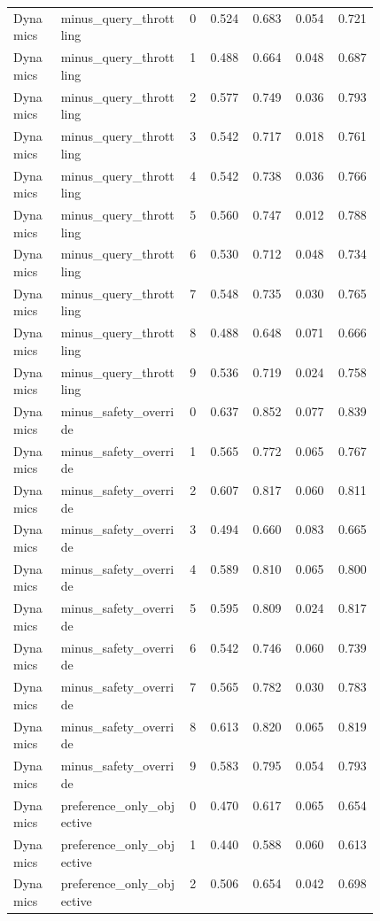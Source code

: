 \documentclass{article}
\begin{document}
\begin{center}
\begin{longtable}{p{0.13\linewidth}p{0.35\linewidth}rrrrr}
Dynamics & minus\_query\_throttling & 0 & 0.524 & 0.683 & 0.054 & 0.721\\
Dynamics & minus\_query\_throttling & 1 & 0.488 & 0.664 & 0.048 & 0.687\\
Dynamics & minus\_query\_throttling & 2 & 0.577 & 0.749 & 0.036 & 0.793\\
Dynamics & minus\_query\_throttling & 3 & 0.542 & 0.717 & 0.018 & 0.761\\
Dynamics & minus\_query\_throttling & 4 & 0.542 & 0.738 & 0.036 & 0.766\\
Dynamics & minus\_query\_throttling & 5 & 0.560 & 0.747 & 0.012 & 0.788\\
Dynamics & minus\_query\_throttling & 6 & 0.530 & 0.712 & 0.048 & 0.734\\
Dynamics & minus\_query\_throttling & 7 & 0.548 & 0.735 & 0.030 & 0.765\\
Dynamics & minus\_query\_throttling & 8 & 0.488 & 0.648 & 0.071 & 0.666\\
Dynamics & minus\_query\_throttling & 9 & 0.536 & 0.719 & 0.024 & 0.758\\
Dynamics & minus\_safety\_override & 0 & 0.637 & 0.852 & 0.077 & 0.839\\
Dynamics & minus\_safety\_override & 1 & 0.565 & 0.772 & 0.065 & 0.767\\
Dynamics & minus\_safety\_override & 2 & 0.607 & 0.817 & 0.060 & 0.811\\
Dynamics & minus\_safety\_override & 3 & 0.494 & 0.660 & 0.083 & 0.665\\
Dynamics & minus\_safety\_override & 4 & 0.589 & 0.810 & 0.065 & 0.800\\
Dynamics & minus\_safety\_override & 5 & 0.595 & 0.809 & 0.024 & 0.817\\
Dynamics & minus\_safety\_override & 6 & 0.542 & 0.746 & 0.060 & 0.739\\
Dynamics & minus\_safety\_override & 7 & 0.565 & 0.782 & 0.030 & 0.783\\
Dynamics & minus\_safety\_override & 8 & 0.613 & 0.820 & 0.065 & 0.819\\
Dynamics & minus\_safety\_override & 9 & 0.583 & 0.795 & 0.054 & 0.793\\
Dynamics & preference\_only\_objective & 0 & 0.470 & 0.617 & 0.065 & 0.654\\
Dynamics & preference\_only\_objective & 1 & 0.440 & 0.588 & 0.060 & 0.613\\
Dynamics & preference\_only\_objective & 2 & 0.506 & 0.654 & 0.042 & 0.698\\

\end{longtable}
\end{center}
\end{document}
